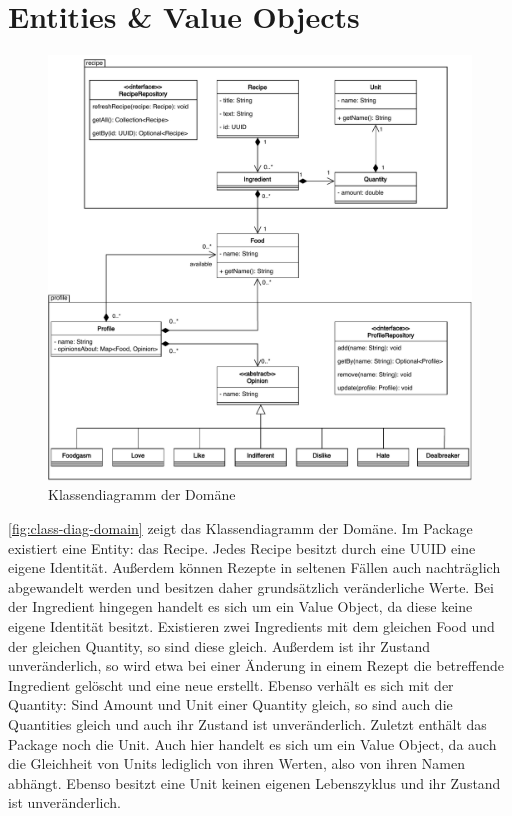 \section{Entities \& Value Objects}

\begin{figure}[ht!]
    \includegraphics[width=0.98\columnwidth]{../diagrams/domain_uml.pdf}
    \caption{Klassendiagramm der Domäne}
    \label{fig:class-diag-domain}
\end{figure}

\autoref{fig:class-diag-domain} zeigt das Klassendiagramm der Domäne. Im Package \href{https://github.com/anditru/quickie/tree/bb41442c7f1ffbfcd3117cd86a40f7932e543a33/3-quickie-domain/src/main/java/org/pinkcrazyunicorn/quickie/domain/recipe}{} existiert eine Entity: das Recipe. Jedes Recipe besitzt durch eine UUID eine eigene Identität. Außerdem können Rezepte in seltenen Fällen auch nachträglich abgewandelt werden und besitzen daher grundsätzlich veränderliche Werte. Bei der Ingredient hingegen handelt es sich um ein Value Object, da diese keine eigene Identität besitzt. Existieren zwei Ingredients mit dem gleichen Food und der gleichen Quantity, so sind diese gleich. Außerdem ist ihr Zustand unveränderlich, so wird etwa bei einer Änderung in einem Rezept die betreffende Ingredient gelöscht und eine neue erstellt. Ebenso verhält es sich mit der Quantity: Sind Amount und Unit einer Quantity gleich, so sind auch die Quantities gleich und auch ihr Zustand ist unveränderlich. Zuletzt enthält das Package noch die Unit. Auch hier handelt es sich um ein Value Object, da auch die Gleichheit von Units lediglich von ihren Werten, also von ihren Namen abhängt. Ebenso besitzt eine Unit keinen eigenen Lebenszyklus und ihr Zustand ist unveränderlich.

